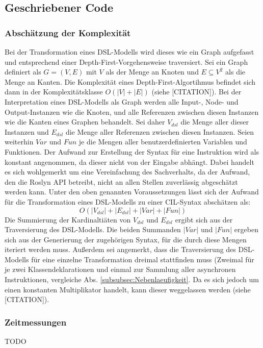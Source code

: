 \subsection{Geschriebener Code}

\subsubsection{Abschätzung der Komplexität}
Bei der Transformation eines DSL-Modells wird dieses wie ein Graph aufgefasst und entsprechend einer Depth-First-Vorgehensweise traversiert. Sei ein Graph definiert als $G = (V, E)$ mit $V$ als der Menge an Knoten und $E \subseteq V^{2}$ als die Menge an Kanten. Die Komplexität eines Depth-First-Algortihmus befindet sich dann in der Komplexitätsklasse $O(\left\vert{V}\right\vert + \left\vert{E}\right\vert)$ (siehe [CITATION]). Bei der Interpretation eines DSL-Modells als Graph werden alle Input-, Node- und Output-Instanzen wie die Knoten, und alle Referenzen zwischen diesen Instanzen wie die Kanten eines Graphen behandelt. Sei daher $V_{dsl}$ die Menge aller dieser Instanzen und $E_{dsl}$ die Menge aller Referenzen zwischen diesen Instanzen. Seien weiterhin $Var$ und $Fun$  je die Mengen aller benutzerdefinierten Variablen und Funktionen. Der Aufwand zur Erstellung der Syntax für eine Instruktion wird als konstant angenommen, da dieser nicht von der Eingabe abhängt. Dabei handelt es sich wohlgemerkt um eine Vereinfachung des Sachverhalts, da der Aufwand, den die Roslyn API betreibt, nicht an allen Stellen zuverlässig abgeschätzt werden kann. 
\newline
Unter den oben genannten Voraussetzungen lässt sich der Aufwand für die Transformation eines DSL-Modells zu einer CIL-Syntax abschätzen als:
$$ O( \left\vert{V_{dsl}}\right\vert + \left\vert{E_{dsl}}\right\vert + \left\vert{Var}\right\vert + \left\vert{Fun}\right\vert ) $$
Die Summierung der Kardinaltiäten von $V_{dsl}$ und $E_{dsl}$ ergibt sich aus der Traversierung des DSL-Modells. Die beiden Summanden $\left\vert{Var}\right\vert$ und $\left\vert{Fun}\right\vert$ ergeben sich aus der Generierung der zugehörigen Syntax, für die durch diese Mengen iteriert werden muss. Außerdem sei angemerkt, dass die Traversierung des DSL-Modells für eine einzelne Transformation dreimal stattfinden muss (Zweimal für je zwei Klassendeklarationen und einmal zur Sammlung aller asynchronen Instruktionen, vergleiche Abs. \ref{subsubsec:Nebenlaeufigkeit}. Da es sich jedoch um einen konstanten Multiplikator handelt, kann dieser weggelassen werden (siehe [CITATION]). 

\subsubsection{Zeitmessungen}
TODO